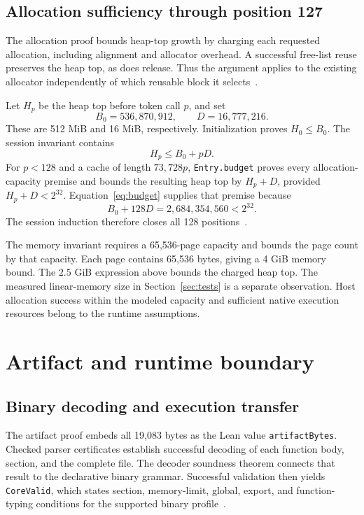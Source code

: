 \documentclass[11pt]{article}
\newcommand{\code}[1]{\texttt{#1}}
\begin{document}
\subsection{Allocation sufficiency through position 127}

The allocation proof bounds heap-top growth by charging each requested allocation, including alignment and allocator overhead.  A successful free-list reuse preserves the heap top, as does release.  Thus the argument applies to the existing allocator independently of which reusable block it selects~\cite{budget}.

Let $H_p$ be the heap top before token call $p$, and set
\[
B_0=536{,}870{,}912,\qquad D=16{,}777{,}216.
\]
These are 512 MiB and 16 MiB, respectively.  Initialization proves $H_0\leq B_0$.  The session invariant contains
\begin{equation}\label{eq:budget}
H_p\leq B_0+pD.
\end{equation}
For $p<128$ and a cache of length $73{,}728p$, \code{Entry.budget} proves every allocation-capacity premise and bounds the resulting heap top by $H_p+D$, provided $H_p+D<2^{32}$.  Equation~\eqref{eq:budget} supplies that premise because
\[
B_0+128D=2{,}684{,}354{,}560<2^{32}.
\]
The session induction therefore closes all 128 positions~\cite{budget,session}.

The memory invariant requires a 65,536-page capacity and bounds the page count by that capacity.  Each page contains 65,536 bytes, giving a 4 GiB memory bound.  The $2.5$ GiB expression above bounds the charged heap top.  The measured linear-memory size in Section~\ref{sec:tests} is a separate observation.  Host allocation success within the modeled capacity and sufficient native execution resources belong to the runtime assumptions.

\section{Artifact and runtime boundary}\label{sec:boundary}

\subsection{Binary decoding and execution transfer}

The artifact proof embeds all 19,083 bytes as the Lean value \code{artifactBytes}.  Checked parser certificates establish successful decoding of each function body, section, and the complete file.  The decoder soundness theorem connects that result to the declarative binary grammar.  Successful validation then yields \code{CoreValid}, which states section, memory-limit, global, export, and function-typing conditions for the supported binary profile~\cite{binary,artifact}.
\end{document}
